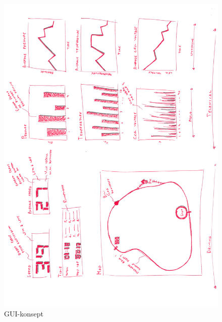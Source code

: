 \begin{figure}[H]
\caption{GUI-konsept} 
\label{gui-concept}
\includegraphics[width=\textwidth]{images/gui_concept_hans.pdf}
\end{figure}

